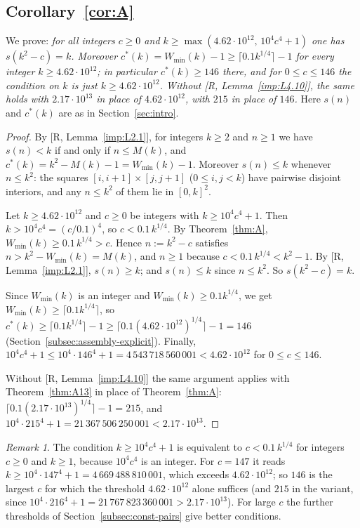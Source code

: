\documentclass[11pt]{amsart}
\theoremstyle{definition}
\theoremstyle{remark}
\newtheorem{remark}[theorem]{Remark}
\numberwithin{equation}{section}
\begin{document}
\subsection{Corollary~\ref{cor:A}}\label{subsec:assembly-cor}

We prove: \emph{for all integers $c\ge0$ and $k\ge\max(4.62\cdot10^{12},\,10^4c^4+1)$ one has $s(k^2-c)=k$.
Moreover $c^*(k)=W_{\min}(k)-1\ge\lceil0.1k^{1/4}\rceil-1$ for every integer $k\ge4.62\cdot10^{12}$; in particular
$c^*(k)\ge146$ there, and for $0\le c\le146$ the condition on $k$ is just $k\ge4.62\cdot10^{12}$. Without
[R, Lemma~\ref{imp:L4.10}], the same holds with $2.17\cdot10^{13}$ in place of $4.62\cdot10^{12}$, with $215$ in place
of $146$.} Here $s(n)$ and $c^*(k)$ are as in Section~\ref{sec:intro}.

\begin{proof}
By [R, Lemma~\ref{imp:L2.1}], for integers $k\ge2$ and $n\ge1$ we have $s(n)<k$ if and only if $n\le M(k)$, and
$c^*(k)=k^2-M(k)-1=W_{\min}(k)-1$. Moreover $s(n)\le k$ whenever $n\le k^2$: the squares $[i,i+1]\times[j,j+1]$
($0\le i,j<k$) have pairwise disjoint interiors, and any $n\le k^2$ of them lie in $[0,k]^2$.

Let $k\ge4.62\cdot10^{12}$ and $c\ge0$ be integers with $k\ge10^4c^4+1$. Then $k>10^4c^4=(c/0.1)^4$, so
$c<0.1\,k^{1/4}$. By Theorem~\ref{thm:A}, $W_{\min}(k)\ge0.1\,k^{1/4}>c$. Hence $n:=k^2-c$ satisfies
$n>k^2-W_{\min}(k)=M(k)$, and $n\ge1$ because $c<0.1\,k^{1/4}<k^2-1$. By [R, Lemma~\ref{imp:L2.1}], $s(n)\ge k$; and
$s(n)\le k$ since $n\le k^2$. So $s(k^2-c)=k$.

Since $W_{\min}(k)$ is an integer and $W_{\min}(k)\ge0.1k^{1/4}$, we get $W_{\min}(k)\ge\lceil0.1k^{1/4}\rceil$, so
$c^*(k)\ge\lceil0.1k^{1/4}\rceil-1\ge\lceil0.1(4.62\cdot10^{12})^{1/4}\rceil-1=146$
(Section~\ref{subsec:assembly-explicit}). Finally, $10^4c^4+1\le10^4\cdot146^4+1=4\,543\,718\,560\,001<4.62\cdot10^{12}$ for
$0\le c\le146$.

Without [R, Lemma~\ref{imp:L4.10}] the same argument applies with Theorem~\ref{thm:A13} in place of
Theorem~\ref{thm:A}: $\lceil0.1(2.17\cdot10^{13})^{1/4}\rceil-1=215$, and
$10^4\cdot215^4+1=21\,367\,506\,250\,001<2.17\cdot10^{13}$.
\end{proof}

\begin{remark}\label{rem:assembly-cor}
The condition $k\ge10^4c^4+1$ is equivalent to $c<0.1\,k^{1/4}$ for integers $c\ge0$ and $k\ge1$, because
$10^4c^4$ is an integer. For $c=147$ it reads $k\ge10^4\cdot147^4+1=4\,669\,488\,810\,001$, which exceeds
$4.62\cdot10^{12}$; so $146$ is the largest $c$ for which the threshold $4.62\cdot10^{12}$ alone suffices (and $215$ in
the variant, since $10^4\cdot216^4+1=21\,767\,823\,360\,001>2.17\cdot10^{13}$). For large $c$ the further thresholds of
Section~\ref{subsec:const-pairs} give better conditions.
\end{remark}
\end{document}
